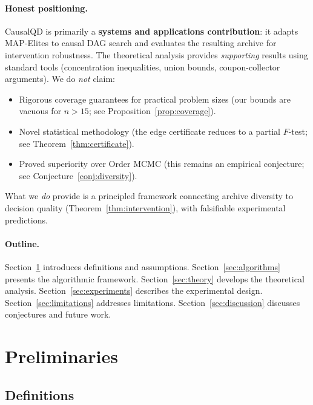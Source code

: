 \documentclass{article}
\theoremstyle{definition}
\theoremstyle{plain}
\theoremstyle{remark}
\begin{document}
\paragraph{Honest positioning.}
CausalQD is primarily a \textbf{systems and applications contribution}: it
adapts MAP-Elites to causal DAG search and evaluates the resulting archive for
intervention robustness. The theoretical analysis provides \emph{supporting}
results using standard tools (concentration inequalities, union bounds,
coupon-collector arguments). We do \emph{not} claim:
\begin{itemize}
  \item Rigorous coverage guarantees for practical problem sizes (our bounds are
        vacuous for $n > 15$; see Proposition~\ref{prop:coverage}).
  \item Novel statistical methodology (the edge certificate reduces to a partial
        $F$-test; see Theorem~\ref{thm:certificate}).
  \item Proved superiority over Order MCMC (this remains an empirical conjecture;
        see Conjecture~\ref{conj:diversity}).
\end{itemize}
What we \emph{do} provide is a principled framework connecting archive diversity
to decision quality (Theorem~\ref{thm:intervention}), with falsifiable
experimental predictions.

\paragraph{Outline.}
Section~\ref{sec:prelim} introduces definitions and assumptions.
Section~\ref{sec:algorithms} presents the algorithmic framework.
Section~\ref{sec:theory} develops the theoretical analysis.
Section~\ref{sec:experiments} describes the experimental design.
Section~\ref{sec:limitations} addresses limitations.
Section~\ref{sec:discussion} discusses conjectures and future work.


\section{Preliminaries}
\label{sec:prelim}

\subsection{Definitions}
\end{document}
